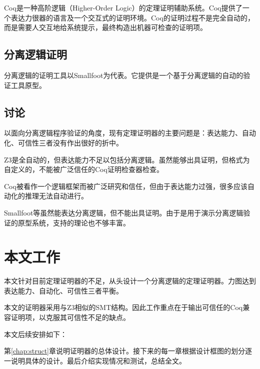 Coq\cite{coq}是一种高阶逻辑（Higher-Order Logic）的定理证明辅助系统。Coq提供了一个表达力很器的语言及一个交互式的证明环境。Coq的证明过程不是完全自动的，而是需要人交互地给系统提示，最终构造出机器可检查的证明项。

\subsection{分离逻辑证明}
分离逻辑的证明工具以Smallfoot\cite{smallfoot}为代表。它提供是一个基于分离逻辑的自动的验证工具原型。

\subsection{讨论}
以面向分离逻辑程序验证的角度，现有定理证明器的主要问题是：表达能力、自动化、可信性三者没有作出很好的折中。

Z3是全自动的，但表达能力不足以包括分离逻辑。虽然能够出具证明，但格式为自定义的，不能被广泛信任的Coq证明检查器检查。

Coq被看作一个逻辑框架而被广泛研究和信任，但由于表达能力过强，很多应该自动化的推理无法自动进行。

Smallfoot等虽然能表达分离逻辑，但不能出具证明。由于是用于演示分离逻辑验证的原型系统，支持的理论也不够丰富。

\section{本文工作}
本文针对目前定理证明器的不足，从头设计一个分离逻辑的定理证明器。力图达到表达能力、自动化、可信性三者平衡。

本文的证明器采用与Z3相似的SMT结构。因此工作重点在于输出可信任的Coq兼容证明项，以克服其可信性不足的缺点。

本文后续安排如下：

第\ref{chap:struct}章说明证明器的总体设计。接下来的每一章根据设计框图的划分逐一说明具体的设计。最后介绍实现情况和测试，总结全文。
